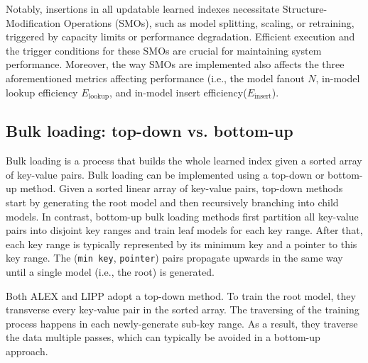 Notably, insertions in all updatable learned indexes necessitate Structure-Modification Operations (SMOs), such as model splitting, scaling, or retraining, triggered by capacity limits or performance degradation. Efficient execution and the trigger conditions for these SMOs are crucial for maintaining system performance. Moreover, the way SMOs are implemented also affects the three aforementioned metrics affecting performance (i.e., the model fanout $N$, in-model lookup efficiency $E_{\text{lookup}}$, and in-model insert efficiency($E_{\text{insert}}$).\


\subsection{Bulk loading: top-down vs. bottom-up}
Bulk loading is a process that builds the whole learned index given a sorted array of key-value pairs. %
Bulk loading can be implemented using a top-down or bottom-up method. Given a sorted linear array of key-value pairs, top-down methods\cite{ding2020alex, wu2021updatable} start by generating the root model and then recursively branching into child models. In contrast, bottom-up bulk loading methods \cite{ferragina2020pgm, tang2020xindex, li2021finedex} first partition all key-value pairs into disjoint key ranges and train leaf models for each key range. After that, each key range is typically represented by its minimum key and a pointer to this key range. The (\texttt{min key}, \texttt{pointer}) pairs propagate upwards in the same way until a single model (i.e., the root) is generated.

Both ALEX and LIPP adopt a top-down method. To train the root model, they transverse every key-value pair in the sorted array. The traversing of the training process happens in each newly-generate sub-key range. As a result, they traverse the data multiple passes, which can typically be avoided in a bottom-up approach.

